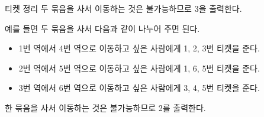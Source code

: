 \begin{problem}{티켓 정리}
	두 묶음을 사서 이동하는 것은 불가능하므로 3을 출력한다.

	\begin{example}
\end{example}

예를 들면 두 묶음을 사서 다음과 같이 나누어 주면 된다.

\begin{itemize}
	\item 1번 역에서 4번 역으로 이동하고 싶은 사람에게 1, 2, 3번 티켓을 준다.
	\item 2번 역에서 5번 역으로 이동하고 싶은 사람에게 1, 6, 5번 티켓을 준다.
	\item 3번 역에서 6번 역으로 이동하고 싶은 사람에게 3, 4, 5번 티켓을 준다.
\end{itemize}

한 묶음을 사서 이동하는 것은 불가능하므로 2를 출력한다.

	
\end{problem}

